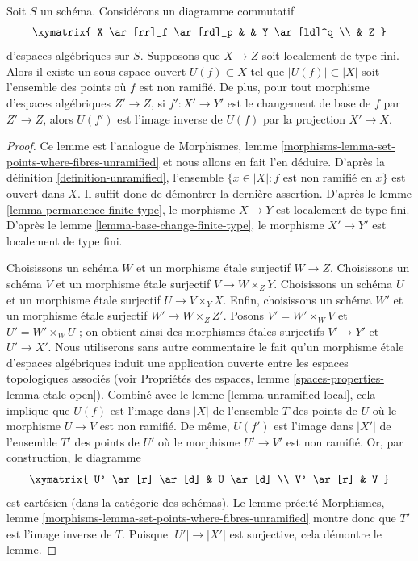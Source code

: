 \begin{lemma}
\label{lemma-where-unramified}
Soit $S$ un schéma. Considérons un diagramme commutatif
$$
\xymatrix{
X \ar[rr]_f \ar[rd]_p & & Y \ar[ld]^q \\
& Z
}
$$
d'espaces algébriques sur $S$. Supposons que $X \to Z$ soit localement de
type fini. Alors il existe un sous-espace ouvert $U(f) \subset X$
tel que $|U(f)| \subset |X|$ soit l'ensemble des points où $f$ est non ramifié.
De plus, pour tout morphisme d'espaces algébriques $Z' \to Z$, si
$f' : X' \to Y'$ est le changement de base de $f$ par $Z' \to Z$, alors
$U(f')$ est l'image inverse de $U(f)$ par la projection $X' \to X$.
\end{lemma}

\begin{proof}
Ce lemme est l'analogue de
Morphismes, lemme \ref{morphisms-lemma-set-points-where-fibres-unramified}
et nous allons en fait l'en déduire. D'après la
définition \ref{definition-unramified},
l'ensemble $\{x \in |X| : f \text{ est non ramifié en }x\}$ est
ouvert dans $X$. Il suffit donc de démontrer la dernière assertion. D'après le
lemme \ref{lemma-permanence-finite-type},
le morphisme $X \to Y$ est localement de type fini. D'après le
lemme \ref{lemma-base-change-finite-type},
le morphisme $X' \to Y'$ est localement de type fini.

\medskip\noindent
Choisissons un schéma $W$ et un morphisme étale surjectif $W \to Z$.
Choisissons un schéma $V$ et un morphisme étale surjectif $V \to W \times_Z Y$.
Choisissons un schéma $U$ et un morphisme étale surjectif $U \to V \times_Y X$.
Enfin, choisissons un schéma $W'$ et un morphisme étale surjectif
$W' \to W \times_Z Z'$.
Posons $V' = W' \times_W V$ et $U' = W' \times_W U$ ; on obtient ainsi des
morphismes étales surjectifs $V' \to Y'$ et $U' \to X'$.
Nous utiliserons sans autre commentaire le fait qu'un morphisme étale d'espaces algébriques
induit une application ouverte entre les espaces topologiques associés (voir
Propriétés des espaces, lemme
\ref{spaces-properties-lemma-etale-open}).
Combiné avec le
lemme \ref{lemma-unramified-local}, cela
implique que $U(f)$ est l'image dans $|X|$ de l'ensemble $T$ des points de $U$
où le morphisme $U \to V$ est non ramifié. De même, $U(f')$ est l'image
dans $|X'|$ de l'ensemble $T'$ des points de $U'$ où le morphisme $U' \to V'$
est non ramifié. Or, par construction, le diagramme
$$
\xymatrix{
U' \ar[r] \ar[d] & U \ar[d] \\
V' \ar[r] & V
}
$$
est cartésien (dans la catégorie des schémas). Le lemme précité
Morphismes, lemme \ref{morphisms-lemma-set-points-where-fibres-unramified}
montre donc que $T'$ est l'image inverse de $T$. Puisque
$|U'| \to |X'|$ est surjective, cela démontre le lemme.
\end{proof}

